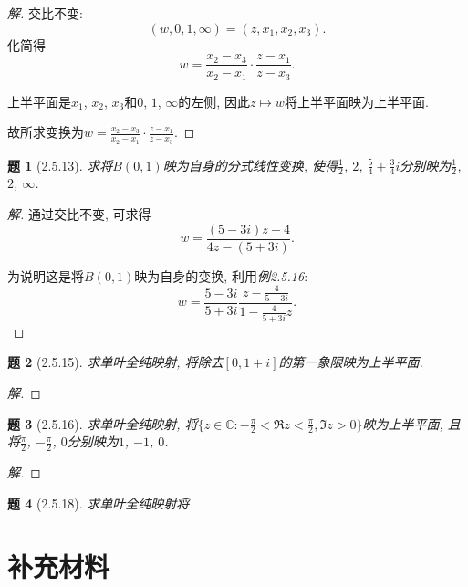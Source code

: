 \documentclass{article}[a4paper, 12pt]
\newtheorem{problem}{题}
\newenvironment{solution}{\begin{proof}[解]}{\end{proof}}
\begin{document}
\begin{solution}
  交比不变:
  \[(w, 0, 1, \infty)=(z,x_1,x_2,x_3).\]
  化简得
  \[w=\frac{x_2-x_3}{x_2-x_1}\cdot\frac{z-x_1}{z-x_3}.\]

  上半平面是\(x_1\), \(x_2\), \(x_3\)和\(0\), \(1\), \(\infty\)的左侧, 因此\(z\mapsto w\)将上半平面映为上半平面.

  故所求变换为\(w=\frac{x_2-x_3}{x_2-x_1}\cdot\frac{z-x_1}{z-x_3}\).
\end{solution}

\begin{problem}[2.5.13]
  求将\(B(0,1)\)映为自身的分式线性变换, 使得\(\frac12\), \(2\), \(\frac54+\frac34i\)分别映为\(\frac12\), \(2\), \(\infty\).
\end{problem}

\begin{solution}
  通过交比不变, 可求得\[w=\frac{(5-3i)z-4}{4z-(5+3i)}.\]

  为说明这是将\(B(0,1)\)映为自身的变换, 利用\emph{例2.5.16}:
  \[w=\frac{5-3i}{5+3i}\frac{z-\frac{4}{5-3i}}{1-\frac{4}{5+3i}z}.\]
\end{solution}

\begin{problem}[2.5.15]
  求单叶全纯映射, 将除去\([0,1+i]\)的第一象限映为上半平面.
\end{problem}

\begin{solution}
  
\end{solution}

\begin{problem}[2.5.16]
  求单叶全纯映射, 将\(\{z\in\mathbb{C}:-\frac\pi2<\Re z<\frac\pi2,\Im z>0\}\)映为上半平面, 且将\(\frac\pi2\), \(-\frac\pi2\), \(0\)分别映为\(1\), \(-1\), \(0\).
\end{problem}

\begin{solution}
  
\end{solution}

\begin{problem}[2.5.18]
  求单叶全纯映射将
\end{problem}

\section{补充材料}
\end{document}
